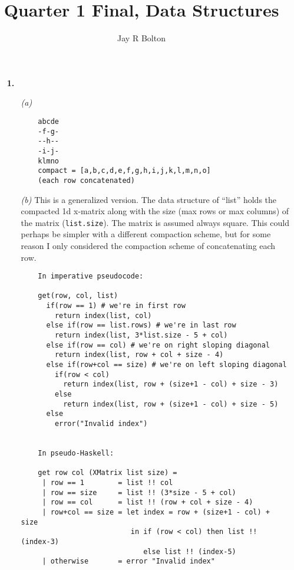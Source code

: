 \documentclass{article}
\title{Quarter 1 Final, Data Structures}
\author{Jay R Bolton}
\begin{document}
\maketitle

\begin{enumerate}

\item[\textbf{1.}]
  \begin{enumerate}
  \item[\emph{(a)}]
    \begin{verbatim}
    abcde
    -f-g-
    --h--
    -i-j-
    klmno
    compact = [a,b,c,d,e,f,g,h,i,j,k,l,m,n,o]
    (each row concatenated)
    \end{verbatim}

  \item[\emph{(b)}]
    This is a generalized version. The data structure of ``list'' holds the
    compacted 1d x-matrix along with the size (max rows or max columns) of
    the matrix (\texttt{list.size}). The matrix is assumed always square. This
    could perhaps be simpler with a different compaction scheme, but for some
    reason I only considered the compaction scheme of concatenating each row.

    \begin{verbatim}
    In imperative pseudocode:

    get(row, col, list)
      if(row == 1) # we're in first row
        return index(list, col)
      else if(row == list.rows) # we're in last row
        return index(list, 3*list.size - 5 + col)
      else if(row == col) # we're on right sloping diagonal
        return index(list, row + col + size - 4)
      else if(row+col == size) # we're on left sloping diagonal
        if(row < col)
          return index(list, row + (size+1 - col) + size - 3)
        else
          return index(list, row + (size+1 - col) + size - 5)
      else
        error("Invalid index")


    In pseudo-Haskell:

    get row col (XMatrix list size) =
     | row == 1        = list !! col
     | row == size     = list !! (3*size - 5 + col)
     | row == col      = list !! (row + col + size - 4)
     | row+col == size = let index = row + (size+1 - col) + size
                          in if (row < col) then list !! (index-3)
                             else list !! (index-5)
     | otherwise       = error "Invalid index"
    \end{verbatim}
    
  \end{enumerate}


\end{enumerate}
\end{document}
